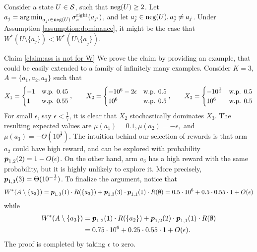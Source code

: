\begin{claim}\label{claim:ass is not for W}
Consider a state $U\in\mathcal{S}$, such that $\textnormal{neg}(U) \geq 2$. Let  $a_j = \operatorname*{arg\,min}_{a_{j'}\in\textnormal{neg}(U)}\sigma^{\textnormal{right}}_\pi(a_{j'})$, and let $a_{\tilde j}\in \textnormal{neg}(U), a_{\tilde j} \neq a_j$. Under Assumption \ref{assumption:dominance}, it might be the case that $W^*(U\setminus \{a_j\}) < W^*(U\setminus \{a_{\tilde j}\})$.
\end{claim}
\begin{proofof}{Claim \ref{claim:ass is not for W}}
We prove the claim by providing an example, that could be easily extended to a family of infinitely many examples. Consider $K=3$, $A=\{a_1,a_2,a_3\}$ such that 
\[
X_1=\begin{cases}
-1 & \textnormal{w.p. 0.45}\\
1 & \textnormal{w.p. 0.55}
\end{cases}, \qquad
X_2=\begin{cases}
-10^6-2\epsilon & \textnormal{w.p. 0.5}\\
10^6 & \textnormal{w.p. 0.5}
\end{cases}, \qquad
X_3=\begin{cases}
-10^{\frac{1}{\epsilon}} & \textnormal{w.p. 0.5}\\
10^6 & \textnormal{w.p. 0.5}
\end{cases}
\]
For small $\epsilon$, say $\epsilon<\frac{1}{7}$, it is clear that $X_2$ stochastically dominates $X_3$. The resulting expected values are $\mu({a_1})=0.1,\mu({a_2})=-\epsilon,$ and $\mu({a_3})= -\Theta(10^{\frac{1}{\epsilon}})$. The intuition behind our selection of rewards is that arm $a_2$ could have high reward, and can be explored with probability $\boldsymbol{ p }_{1,2}(2)=1-O(\epsilon)$. On the other hand, arm $a_3$ has a high reward with the same probability, but it is highly unlikely to explore it. More precisely, $\boldsymbol{ p }_{1,3}(3)=\Theta(10^{-\frac{1}{\epsilon}})$. To finalize the argument, notice that
\[
W^*(A\setminus \{a_2\})=\boldsymbol{ p }_{1,3}(1)\cdot R(\{a_3\})+\boldsymbol{ p }_{1,3}(3)\cdot \boldsymbol{ p }_{1,1}(1)\cdot R(\emptyset)=0.5\cdot 10^6+0.5\cdot 0.55\cdot 1 +O(\epsilon)
\]
while
\begin{align*}
W^*(A\setminus \{a_3\})&=\boldsymbol{ p }_{1,2}(1)\cdot R(\{a_2\})+\boldsymbol{ p }_{1,2}(2)\cdot \boldsymbol{ p }_{1,1}(1)\cdot R(\emptyset)\\
&=0.75\cdot 10^6+0.25\cdot 0.55\cdot 1+O(\epsilon).
\end{align*}
The proof is completed by taking $\epsilon$ to zero.
\end{proofof}

